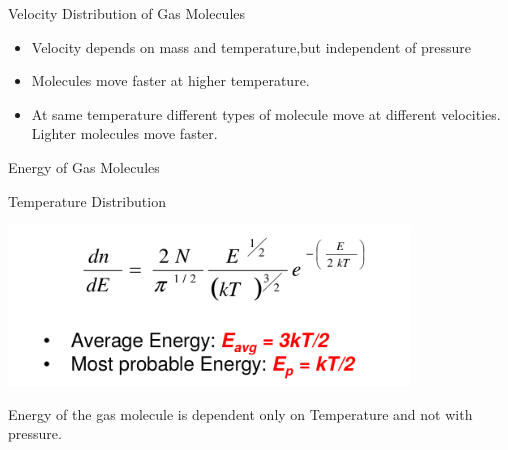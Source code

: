 \documentclass[11]{beamer}
\begin{document}
\begin{frame}{Velocity Distribution of Gas Molecules}
\begin{block}
  
 
    \begin{itemize}
       \item Velocity depends on mass and temperature,but independent of pressure
       \item Molecules move faster at higher temperature.
       \item At same temperature different types of molecule move at different velocities. Lighter molecules move faster.
               
     \end{itemize}
\end{block}  



\end{frame}

\begin{frame}{Energy of Gas Molecules}
\begin{exampleblock}{Temperature Distribution}
          \begin{center}
				\includegraphics[width=0.8\textwidth]{DistributionEnergy.png}
		\end{center}    
       
       \end{exampleblock} 

Energy of the gas molecule is dependent only on Temperature and not with pressure.


\end{frame}
\end{document}
